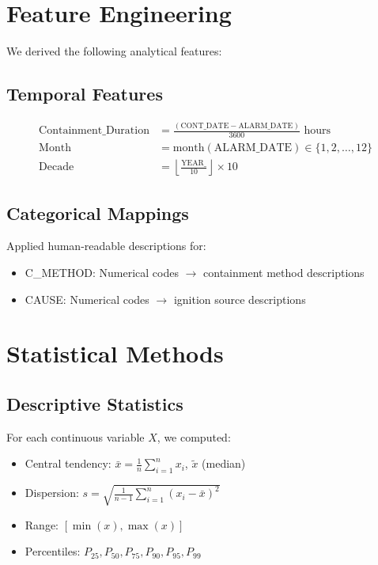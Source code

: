 \documentclass[12pt,a4paper]{article}
\begin{document}
\section{Feature Engineering}

We derived the following analytical features:

\subsection{Temporal Features}

\begin{align}
\text{Containment\_Duration} &= \frac{(\text{CONT\_DATE} - \text{ALARM\_DATE})}{3600} \text{ hours} \\
\text{Month} &= \text{month}(\text{ALARM\_DATE}) \in \{1, 2, \ldots, 12\} \\
\text{Decade} &= \left\lfloor \frac{\text{YEAR\_}}{10} \right\rfloor \times 10
\end{align}

\subsection{Categorical Mappings}

Applied human-readable descriptions for:
\begin{itemize}
    \item C\_METHOD: Numerical codes $\rightarrow$ containment method descriptions
    \item CAUSE: Numerical codes $\rightarrow$ ignition source descriptions
\end{itemize}

\section{Statistical Methods}

\subsection{Descriptive Statistics}

For each continuous variable $X$, we computed:

\begin{itemize}
    \item Central tendency: $\bar{x} = \frac{1}{n}\sum_{i=1}^{n} x_i$, $\tilde{x}$ (median)
    \item Dispersion: $s = \sqrt{\frac{1}{n-1}\sum_{i=1}^{n}(x_i - \bar{x})^2}$
    \item Range: $[\min(x), \max(x)]$
    \item Percentiles: $P_{25}, P_{50}, P_{75}, P_{90}, P_{95}, P_{99}$
\end{itemize}
\end{document}
